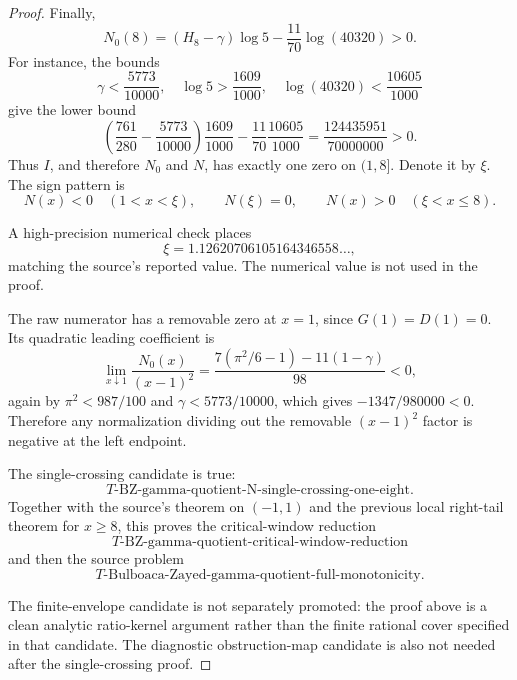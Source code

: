 \begin{proof}
Finally,
\[
N_0(8)=(H_8-\gamma)\log5-\frac{11}{70}\log(40320)>0.
\]
For instance, the bounds
\[
\gamma<\frac{5773}{10000},\quad \log5>\frac{1609}{1000},
\quad \log(40320)<\frac{10605}{1000}
\]
give the lower bound
\[
\left(\frac{761}{280}-\frac{5773}{10000}\right)\frac{1609}{1000}
-\frac{11}{70}\frac{10605}{1000}
=\frac{124435951}{70000000}>0.
\]
Thus \(I\), and therefore \(N_0\) and \(N\), has exactly one zero on
\((1,8]\).  Denote it by \(\xi\).  The sign pattern is
\[
N(x)<0\quad(1<x<\xi),\qquad
N(\xi)=0,\qquad
N(x)>0\quad(\xi<x\le8).
\]

A high-precision numerical check places
\[
\xi=1.12620706105164346558\ldots,
\]
matching the source's reported value.  The numerical value is not used in the
proof.

The raw numerator has a removable zero at \(x=1\), since \(G(1)=D(1)=0\).  Its
quadratic leading coefficient is
\[
\lim_{x\downarrow1}\frac{N_0(x)}{(x-1)^2}
=
\frac{7(\pi^2/6-1)-11(1-\gamma)}{98}<0,
\]
again by \(\pi^2<987/100\) and \(\gamma<5773/10000\), which gives
\(-1347/980000<0\).  Therefore any normalization dividing out the removable
\((x-1)^2\) factor is negative at the left endpoint.

The single-crossing candidate is true:
\[
T\text{-BZ-gamma-quotient-N-single-crossing-one-eight}.
\]
Together with the source's theorem on \((-1,1)\) and the previous local
right-tail theorem for \(x\ge8\), this proves the critical-window reduction
\[
T\text{-BZ-gamma-quotient-critical-window-reduction}
\]
and then the source problem
\[
T\text{-Bulboaca-Zayed-gamma-quotient-full-monotonicity}.
\]

The finite-envelope candidate is not separately promoted: the proof above is a
clean analytic ratio-kernel argument rather than the finite rational cover
specified in that candidate.  The diagnostic obstruction-map candidate is also
not needed after the single-crossing proof.
\end{proof}

